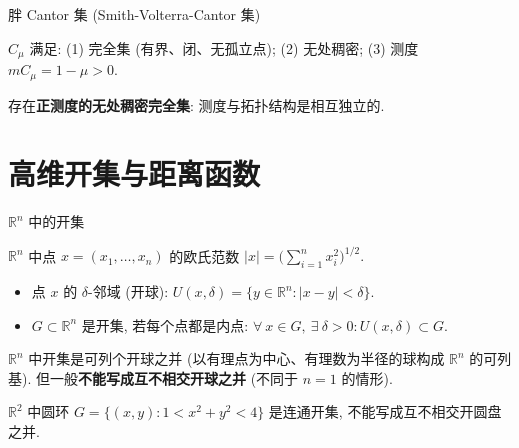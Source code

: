 
\begin{frame}{胖 Cantor 集 (Smith-Volterra-Cantor 集)}

\begin{prop}
$C_\mu$ 满足: (1) 完全集 (有界、闭、无孤立点); (2) 无处稠密; (3) 测度 $m C_\mu = 1 - \mu > 0.$
\end{prop}

\pause
\vspace{0.5em}

\begin{attnblock}
存在\textbf{正测度的无处稠密完全集}: 测度与拓扑结构是相互独立的.
\end{attnblock}

\end{frame}


\section[高维开集]{高维开集与距离函数}


\begin{frame}{$\mathbb{R}^n$ 中的开集}

$\mathbb{R}^n$ 中点 $x = (x_1, \ldots, x_n)$ 的欧氏范数 $|x| = \bigl(\sum_{i=1}^n x_i^2\bigr)^{1/2}.$

\pause

\begin{Def}[开球与开集]
\begin{itemize}
\item 点 $x$ 的 \alert{$\delta$-邻域 (开球)}: $U(x, \delta) = \{y \in \mathbb{R}^n : |x-y| < \delta\}.$
\item $G \subset \mathbb{R}^n$ 是\alert{开集}, 若每个点都是内点: $\forall ~ x \in G,\ \exists ~ \delta > 0: U(x,\delta) \subset G.$
\end{itemize}
\end{Def}

\pause

\begin{remark}
$\mathbb{R}^n$ 中开集是可列个开球之并 (以有理点为中心、有理数为半径的球构成 $\mathbb{R}^n$ 的可列基). 但一般\textbf{不能写成互不相交开球之并} (不同于 $n = 1$ 的情形).
\end{remark}

\pause

\begin{eg}
$\mathbb{R}^2$ 中圆环 $G = \{(x,y) : 1 < x^2+y^2 < 4\}$ 是连通开集, 不能写成互不相交开圆盘之并.
\end{eg}

\end{frame}

